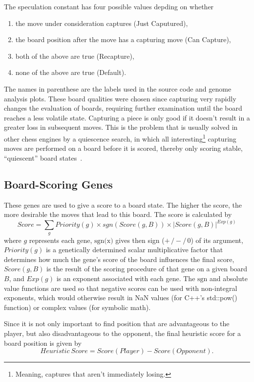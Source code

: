\documentclass[letterpaper]{article}
\newcommand{\cpp}{C{\nobreak+}{\nobreak+}}
\newcommand{\code}[1]{\small\textsf{#1}}
\renewcommand{\_}{\allowbreak\textunderscore\allowbreak}
\begin{document}
The speculation constant has four possible values depding on whether
\begin{enumerate}
	\item the move under consideration captures (Just Caputured),
	\item the board position after the move has a capturing move (Can Capture),
	\item both of the above are true (Recapture),
	\item none of the above are true (Default).
\end{enumerate}
The names in parenthese are the labels used in the source code and genome analysis plots. These board qualities were chosen since capturing very rapidly changes the evaluation of boards, requiring further examination until the board reaches a less volatile state. Capturing a piece is only good if it doesn't result in a greater loss in subsequent moves. This is the problem that is usually solved in other chess engines by a quiescence search, in which all interesting\footnote{Meaning, captures that aren't immediately losing.} capturing moves are performed on a board before it is scored, thereby only scoring stable, ``quiescent'' board states~\cite{quiescence-ref}.

\subsection{Board-Scoring Genes}\label{board-score-section}
These genes are used to give a score to a board state. The higher the score, the more desirable the moves that lead to this board. The score is calculated by
\[Score = \sum_g Priority(g) \times sgn\left(Score(g,B)\right) \times \left|Score(g,B)\right|^{Exp(g)}\]
where \(g\) represents each gene, \(\textrm{sgn(x)}\) gives then sign (\(+\,/-/\,0\)) of its argument, \(Priority(g)\) is a genetically determined scalar multiplicative factor that determines how much the gene's score of the board influences the final score, \(Score(g,B)\) is the result of the scoring procedure of that gene on a given board \(B\), and \(Exp(g)\) is an exponent associated with each gene. The \(\textrm{sgn}\) and absolute value functions are used so that negative scores can be used with non-integral exponents, which would otherwise result in \code{NaN} values (for \cpp's \code{std::pow()} function) or complex values (for symbolic math).

Since it is not only important to find position that are advantageous to the player, but also disadvantageous to the opponent, the final heuristic score for a board position is given by
\[Heuristic\ Score = Score(Player) - Score(Opponent).\]
\end{document}
